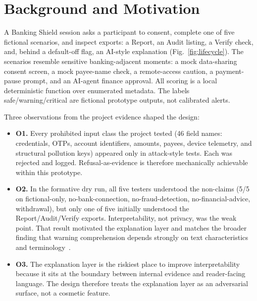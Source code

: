 \documentclass[conference]{IEEEtran}
\newcommand{\sys}{Banking Shield}
\begin{document}
\section{Background and Motivation}

A \sys{} session asks a participant to consent, complete one of five fictional
scenarios, and inspect exports: a Report, an Audit listing, a Verify check, and,
behind a default-off flag, an AI-style explanation (Fig.~\ref{fig:lifecycle}).
The scenarios resemble sensitive banking-adjacent moments: a mock data-sharing
consent screen, a mock payee-name check, a remote-access caution, a
payment-pause prompt, and an AI-agent finance approval. All scoring is a local
deterministic function over enumerated metadata. The labels safe/warning/critical
are fictional prototype outputs, not calibrated alerts.

Three observations from the project evidence shaped the design:

\begin{itemize}
  \item \textbf{O1.} Every prohibited input class the project tested (46 field
    names: credentials, OTPs, account identifiers, amounts, payees, device
    telemetry, and structural pollution keys) appeared only in attack-style
    tests. Each was rejected and logged. Refusal-as-evidence is therefore
    mechanically achievable within this prototype.
  \item \textbf{O2.} In the formative dry run, all five testers understood the
    non-claims (5/5 on fictional-only, no-bank-connection, no-fraud-detection,
    no-financial-advice, withdrawal), but only one of five initially understood
    the Report/Audit/Verify exports. Interpretability, not privacy, was the weak
    point. That result motivated the explanation layer and matches the broader
    finding that warning comprehension depends strongly on text characteristics
    and terminology~\cite{lindell2012protective,scherr2016text}.
  \item \textbf{O3.} The explanation layer is the riskiest place to improve
    interpretability because it sits at the boundary between internal evidence
    and reader-facing language. The design therefore treats the explanation
    layer as an adversarial surface, not a cosmetic feature.
\end{itemize}
\end{document}
